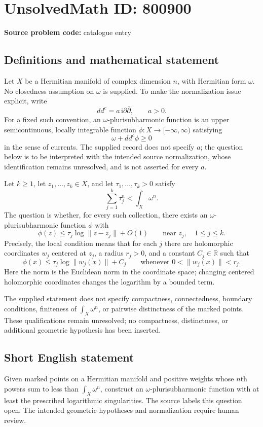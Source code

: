 \documentclass[11pt]{article}
\newcommand{\R}{\mathbb{R}}
\begin{document}
\section*{UnsolvedMath ID: 800900}
\textbf{Source problem code:} catalogue entry
\subsection{Definitions and mathematical statement}
Let \(X\) be a Hermitian manifold of complex dimension \(n\), with Hermitian form \(\omega\). No closedness assumption on \(\omega\) is supplied. To make the normalization issue explicit, write
\[
dd^c=a\,\mathrm{i}\partial\bar\partial,\qquad a>0.
\]
For a fixed such convention, an \(\omega\)-plurisubharmonic function is an upper semicontinuous, locally integrable function \(\phi:X\to[-\infty,\infty)\) satisfying
\[
\omega+dd^c\phi\geq 0
\]
in the sense of currents. The supplied record does not specify \(a\); the question below is to be interpreted with the intended source normalization, whose identification remains unresolved, and is not asserted for every \(a\).

Let \(k\geq1\), let \(z_1,\ldots,z_k\in X\), and let \(\tau_1,\ldots,\tau_k>0\) satisfy
\[
\sum_{j=1}^{k}\tau_j^n<\int_X\omega^n.
\]
The question is whether, for every such collection, there exists an \(\omega\)-plurisubharmonic function \(\phi\) with
\[
\phi(z)\leq\tau_j\log\lVert z-z_j\rVert+O(1)
\qquad\text{near }z_j,\quad 1\leq j\leq k.
\]
Precisely, the local condition means that for each \(j\) there are holomorphic coordinates \(w_j\) centered at \(z_j\), a radius \(r_j>0\), and a constant \(C_j\in\R\) such that
\[
\phi(x)\leq\tau_j\log\lVert w_j(x)\rVert+C_j
\qquad\text{whenever }0<\lVert w_j(x)\rVert<r_j.
\]
Here the norm is the Euclidean norm in the coordinate space; changing centered holomorphic coordinates changes the logarithm by a bounded term.

The supplied statement does not specify compactness, connectedness, boundary conditions, finiteness of \(\int_X\omega^n\), or pairwise distinctness of the marked points. These qualifications remain unresolved; no compactness, distinctness, or additional geometric hypothesis has been inserted.
\subsection{Short English statement}
Given marked points on a Hermitian manifold and positive weights whose \(n\)th powers sum to less than \(\int_X\omega^n\), construct an \(\omega\)-plurisubharmonic function with at least the prescribed logarithmic singularities. The source labels this question open. The intended geometric hypotheses and normalization require human review.
\end{document}
